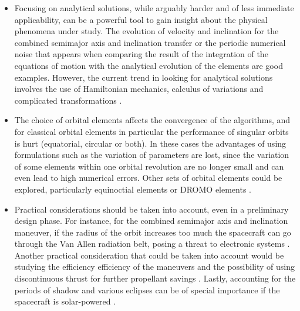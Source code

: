 \begin{itemize}
\item Focusing on analytical solutions, while arguably harder and of less immediate applicability, can be a powerful tool to gain insight about the physical phenomena under study. The evolution of velocity and inclination for the combined semimajor axis and inclination transfer or the periodic numerical noise that appears when comparing the result of the integration of the equations of motion with the analytical evolution of the elements are good examples. However, the current trend in looking for analytical solutions involves the use of Hamiltonian mechanics, calculus of variations and complicated transformations \cite{da2016optimal}.
%
\item The choice of orbital elements affects the convergence of the algorithms, and for classical orbital elements in particular the performance of singular orbits is hurt (equatorial, circular or both). In these cases the advantages of using formulations such as the variation of parameters are lost, since the variation of some elements within one orbital revolution are no longer small and can even lead to high numerical errors. Other sets of orbital elements could be explored, particularly equinoctial elements or DROMO elements \cite{plaez2006dromo}.
%
\item Practical considerations should be taken into account, even in a preliminary design phase. For instance, for the combined semimajor axis and inclination maneuver, if the radius of the orbit increases too much the spacecraft can go through the Van Allen radiation belt, posing a threat to electronic systems \cite{kechichian1997reformulation}. Another practical consideration that could be taken into account would be studying the efficiency efficiency of the maneuvers and the possibility of using discontinuous thrust for further propellant savings \cite{petropoulos2003simple}. Lastly, accounting for the periods of shadow and various eclipses can be of special importance if the spacecraft is solar-powered \cite{kechichian1997reformulation}.
\end{itemize}
